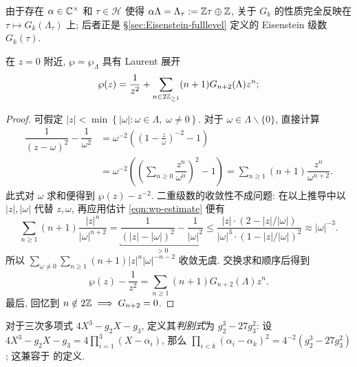 由于存在 $\alpha \in \mathbb{C}^\times$ 和 $\tau \in \mathcal{H}$ 使得 $\alpha\Lambda = \Lambda_\tau := \mathbb{Z}\tau \oplus \mathbb{Z}$, 关于 $G_k$ 的性质完全反映在 $\tau \mapsto G_k(\Lambda_\tau)$ 上; 后者正是 \S\ref{sec:Eisenstein-fulllevel} 定义的 Eisenstein 级数 $G_k(\tau)$.

\begin{proposition}\label{prop:wp-Laurent}
	在 $z = 0$ 附近, $\wp = \wp_\Lambda$ 具有 Laurent 展开
	\[ \wp(z) = \dfrac{1}{z^2} + \sum_{n \in 2\mathbb{Z}_{\geq 1}} (n+1) G_{n+2}(\Lambda) z^n; \]
\end{proposition}
\begin{proof}
	可假定 $|z| < \min\left\{ |\omega| : \omega \in \Lambda, \; \omega \neq 0 \right\}$. 对于 $\omega \in \Lambda \smallsetminus \{0\}$, 直接计算
	\begin{align*}
		\dfrac{1}{(z - \omega)^2} - \dfrac{1}{\omega^2} & = \omega^{-2} \left( \left(1 - \frac{z}{\omega}\right)^{-2} - 1 \right) \\
		& = \omega^{-2} \left( \left( \sum_{n \geq 0} \dfrac{z^n}{\omega^n} \right)^2 - 1 \right) = \sum_{n \geq 1} (n+1) \dfrac{z^n}{\omega^{n+2}}.
	\end{align*}
	此式对 $\omega$ 求和便得到 $\wp(z) - z^{-2}$. 二重级数的收敛性不成问题: 在以上推导中以 $|z|, |\omega|$ 代替 $z, \omega$, 再应用估计 \eqref{eqn:wp-estimate} 便有
	\[ \sum_{n \geq 1} (n+1) \dfrac{|z|^n}{|\omega|^{n+2}} = \underbracket{ \dfrac{1}{(|z|-|\omega|)^2} - \dfrac{1}{|\omega|^2} }_{> 0} \leq \dfrac{ |z| \cdot \left( 2 - |z|/|\omega| \right) }{ |\omega|^3 \cdot \left( 1 - |z|/|\omega| \right)^2 } \approx |\omega|^{-3}. \]
	所以 $\sum_{\omega \neq 0} \sum_{n \geq 1} (n+1) |z|^n |\omega|^{-n-2}$ 收敛无虞.	交换求和顺序后得到
	\[ \wp(z) - \frac{1}{z^2} = \sum_{n \geq 1} (n+1) G_{n+2}(\Lambda) z^n. \]
	最后, 回忆到 $n \notin 2\mathbb{Z} \implies G_{n+2} = 0$.
\end{proof}

\begin{convention}\label{conv:discriminant}
	对于三次多项式 $4X^3 - g_2 X - g_3$, 定义其\emph{判别式}为 $g_2^3 - 27 g_3^2$: 设 $4X^3 - g_2 X - g_3 = 4 \prod_{i=1}^3 (X - \alpha_i)$, 那么 $\prod_{i < k} (\alpha_i - \alpha_k)^2 = 4^{-2} (g_2^3 - 27 g_3^2)$; 这兼容于 \cite[\S 5.8]{Li1} 的定义.
\end{convention}

